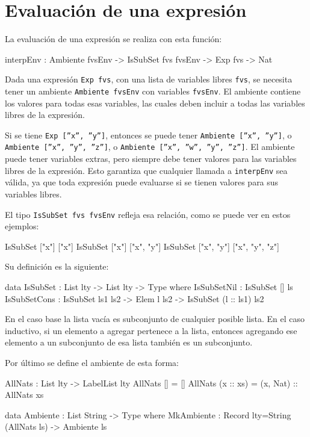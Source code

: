 \section{Evaluación de una expresión}

La evaluación de una expresión se realiza con esta función:

\begin{code}
interpEnv : Ambiente fvsEnv -> IsSubSet fvs fvsEnv ->
  Exp fvs -> Nat
\end{code}

Dada una expresión \texttt{Exp fvs}, con una lista de variables libres \texttt{fvs}, se necesita tener un ambiente \texttt{Ambiente fvsEnv} con variables \texttt{fvsEnv}. El ambiente contiene los valores para todas esas variables, las cuales deben incluir a todas las variables libres de la expresión.

Si se tiene \texttt{Exp [''x'', ''y'']}, entonces se puede tener \texttt{Ambiente [''x'', ''y'']}, o \texttt{Ambiente [''x'', ''y'', ''z'']}, o \texttt{Ambiente [''x'', ''w'', ''y'', ''z'']}. El ambiente puede tener variables extras, pero siempre debe tener valores para las variables libres de la expresión. Esto garantiza que cualquier llamada a \texttt{interpEnv} sea válida, ya que toda expresión puede evaluarse si se tienen valores para sus variables libres.

El tipo \texttt{IsSubSet fvs fvsEnv} refleja esa relación, como se puede ver en estos ejemplos:

\begin{code}
IsSubSet ["x"] ["x"]
IsSubSet ["x"] ["x", "y"]
IsSubSet ["x", "y"] ["x", "y", "z"]
\end{code}

Su definición es la siguiente:

\begin{code}
data IsSubSet : List lty -> List lty -> Type where
  IsSubSetNil : IsSubSet [] ls
  IsSubSetCons : IsSubSet ls1 ls2 -> Elem l ls2 ->
    IsSubSet (l :: ls1) ls2
\end{code}

En el caso base la lista vacía es subconjunto de cualquier posible lista. En el caso inductivo, si un elemento a agregar pertenece a la lista, entonces agregando ese elemento a un subconjunto de esa lista también es un subconjunto.

Por último se define el ambiente de esta forma:

\begin{code}
AllNats : List lty -> LabelList lty
AllNats [] = []
AllNats (x :: xs) = (x, Nat) :: AllNats xs

data Ambiente : List String -> Type where
  MkAmbiente : Record {lty=String} (AllNats ls) -> Ambiente ls
\end{code}

